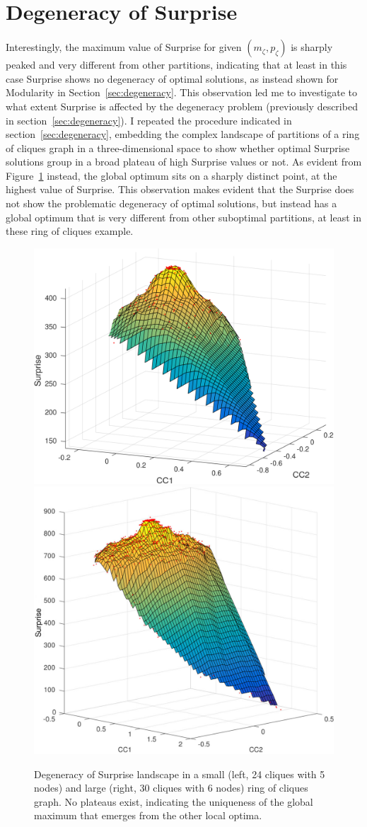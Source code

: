 \section{Degeneracy of Surprise}\label{sec:degeneracy_surprise}
Interestingly, the maximum value of Surprise for given $(m_\zeta,p_\zeta)$ is sharply peaked and very different from other partitions, indicating that at least in this case Surprise shows no degeneracy of optimal solutions, as instead shown for Modularity in Section~\ref{sec:degeneracy}.
This observation led me to investigate to what extent Surprise is affected by the degeneracy problem (previously described in section~\ref{sec:degeneracy}).
I repeated the procedure indicated in section~\ref{sec:degeneracy}, embedding the complex landscape of partitions of a ring of cliques graph in a three-dimensional space to show whether optimal Surprise solutions group in a broad plateau of high Surprise values or not.
As evident from Figure~\ref{fig:degeneracy_surprise} instead, the global optimum sits on a sharply distinct point, at the highest value of Surprise.
This observation makes evident that the Surprise does not show the problematic degeneracy of optimal solutions, but instead has a global optimum that is very different from other suboptimal partitions, at least in these ring of cliques example.
\begin{figure}[ht]
\centering
\includegraphics[height=0.4\textwidth]{images/degeneracy_surprise_n_5_c_24.png}\hfill
\includegraphics[height=0.4\textwidth]{images/degeneracy_surprise_n6_c30.png}
\caption{Degeneracy of Surprise landscape in a small (left, 24 cliques with 5 nodes) and large (right, 30 cliques with 6 nodes) ring of cliques graph. No plateaus exist, indicating the uniqueness of the global maximum that emerges from the other local optima.}
\label{fig:degeneracy_surprise}
\end{figure}

